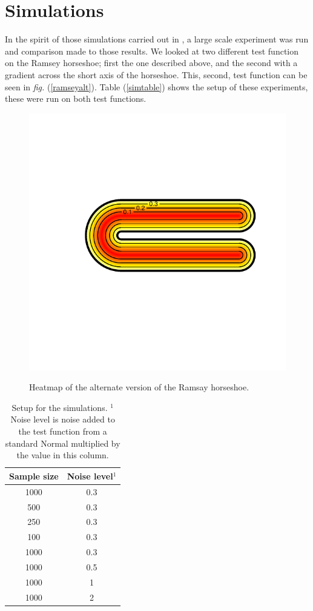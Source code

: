 \documentclass[a4paper,10pt]{amsart}
\newcommand{\fig}[1]{\emph{fig.} (\ref{#1})}
\begin{document}
\section{Simulations}

In the spirit of those simulations carried out in \cite{soap}, a large scale experiment was run and comparison made to those results. We looked at two different test function on the Ramsey horseshoe; first the one described above, and the second with a gradient across the short axis of the horseshoe. This, second, test function can be seen in \fig{ramseyalt}. Table (\ref{simtable}) shows the setup of these experiments, these were run on both test functions.


\begin{figure}
\centering
\includegraphics[trim=1.5in 1in 0.5in 1in]{figs/altramsayhorseshoe.pdf} \\
\caption{Heatmap of the alternate version of the Ramsay horseshoe.}
\label{altramsayshorseshoe}
\end{figure}

\begin{table}[ht]
\begin{tabular}{c c}\\
Sample size & Noise level$^{1}$ \\
\hline
1000 & 0.3 \\
500 & 0.3 \\
250 & 0.3 \\
100 & 0.3 \\
1000 & 0.3 \\
1000 & 0.5 \\
1000 & 1 \\
1000 & 2 \\
\end{tabular}
\caption{Setup for the simulations. $^{1}$Noise level is noise added to the test function from a standard Normal multiplied by the value in this column. }
\end{table}
\end{document}
